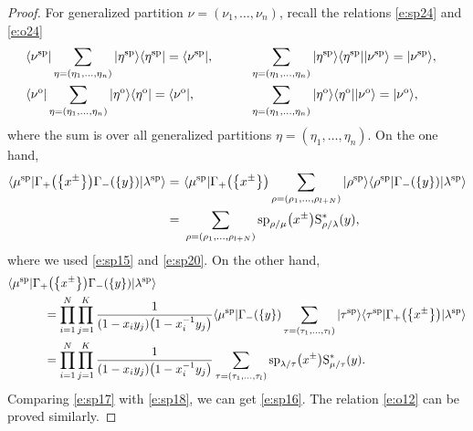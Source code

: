 \documentclass[10pt,a4paper]{amsart}
\numberwithin{equation}{section}
\begin{document}
\begin{proof}For generalized partition $\nu=(\nu_1,\dots,\nu_n)$, recall the relations \eqref{e:sp24} and \eqref{e:o24}
\begin{alignat*}{3}
&\langle\nu^{\rm sp}|\sum_{\eta=(\eta_1,\dots,\eta_n)}|\eta^{\rm sp}\rangle\langle\eta^{\rm sp}| = \langle\nu^{\rm sp}|,\qquad&& \sum_{\eta=(\eta_1,\dots,\eta_n)}|\eta^{\rm sp}\rangle\langle\eta^{\rm sp}||\nu^{\rm sp}\rangle = |\nu^{\rm sp}\rangle,&\\
&\langle\nu^{\rm o}|\sum_{\eta=(\eta_1,\dots,\eta_n)}|\eta^{\rm o}\rangle\langle\eta^{\rm o}| = \langle\nu^{\rm o}|,\qquad&& \sum_{\eta=(\eta_1,\dots,\eta_n)}|\eta^{\rm o}\rangle\langle\eta^{\rm o}||\nu^{\rm o}\rangle = |\nu^{\rm o}\rangle,&
\end{alignat*}
where the sum is over all generalized partitions $\eta=(\eta_1,\dots,\eta_n)$.
On the one hand,
\begin{align}\label{e:sp17}
\notag\langle\mu^{\rm sp}|\Gamma_+\big(\big\{x^{\pm}\big\}\big)\Gamma_-(\{y\})|\lambda^{\rm sp}\rangle=~&\langle\mu^{\rm sp}|\Gamma_+\big(\big\{x^{\pm}\big\}\big)\sum_{\rho=(\rho_1,\dots,\rho_{l+N}) }|\rho^{\rm sp}\rangle\langle\rho^{\rm sp}|\Gamma_-(\{y\})|\lambda^{\rm sp}\rangle\\
=~&\sum_{\rho=(\rho_1,\dots,\rho_{l+N})}{\rm sp}_{\rho/\mu}\big(x^{\pm}\big){\rm S}^*_{\rho/\lambda}(y),
\end{align}
where we used \eqref{e:sp15} and \eqref{e:sp20}. On the other hand,
\begin{align}
&\langle\mu^{\rm sp}|\Gamma_+\big(\big\{x^{\pm}\big\}\big)\Gamma_-(\{y\})|\lambda^{\rm sp}\rangle \nonumber\\
&\qquad\quad{}=\prod^N_{i=1}\prod^K_{j=1}\frac{1}{(1-x_iy_j)\big(1-x^{-1}_iy_j\big)}\langle\mu^{\rm sp}|\Gamma_-(\{y\})\sum_{\tau=(\tau_1,\dots,\tau_l) }|\tau^{\rm sp}\rangle\langle\tau^{\rm sp}|\Gamma_+\big(\big\{x^{\pm}\big\}\big)|\lambda^{\rm sp}\rangle \nonumber\\
&\qquad\quad{}=\prod^N_{i=1}\prod^K_{j=1}\frac{1}{(1-x_iy_j)\big(1-x^{-1}_iy_j\big)}\sum_{\tau=(\tau_1,\dots,\tau_l)}{\rm sp}_{\lambda/\tau}\big(x^{\pm}\big){\rm S}^*_{\mu/\tau}(y).\label{e:sp18}
\end{align}
Comparing \eqref{e:sp17} with \eqref{e:sp18}, we can get \eqref{e:sp16}. The relation \eqref{e:o12} can be proved similarly.
\end{proof}
\end{document}
